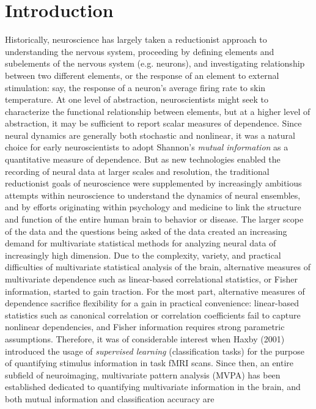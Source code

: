 \documentclass[12pt]{article}
\begin{document}
\section{Introduction}

Historically, neuroscience has largely taken a reductionist approach
to understanding the nervous system, proceeding by defining elements
and subelements of the nervous system (e.g. neurons), and
investigating relationship between two different elements, or the
response of an element to external stimulation: say, the response of a
neuron's average firing rate to skin temperature.  At one level of
abstraction, neuroscientists might seek to characterize the functional
relationship between elements, but at a higher level of abstraction,
it may be sufficient to report scalar measures of dependence.  Since
neural dynamics are generally both stochastic and nonlinear, it was a
natural choice for early neuroscientists to adopt
Shannon's \emph{mutual information} as a quantitative measure of
dependence.  But as new technologies enabled the recording of neural
data at larger scales and resolution, the traditional reductionist
goals of neuroscience were supplemented by increasingly ambitious
attempts within neuroscience to understand the dynamics of neural
ensembles, and by efforts originating within psychology and medicine
to link the structure and function of the entire human brain to
behavior or disease.  The larger scope of the data and the questions
being asked of the data created an increasing demand for multivariate
statistical methods for analyzing neural data of increasingly high
dimension.  Due to the complexity, variety, and practical difficulties
of multivariate statistical analysis of the brain, alternative
measures of multivariate dependence such as linear-based correlational
statistics, or Fisher information, started to gain traction.  For the
most part, alternative measures of dependence sacrifice flexibility
for a gain in practical convenience: linear-based statistics such as
canonical correlation or correlation coefficients fail to capture
nonlinear dependencies, and Fisher information requires strong
parametric assumptions.  Therefore, it was of considerable interest
when Haxby (2001) introduced the usage of \emph{supervised learning}
(classification tasks) for the purpose of quantifying stimulus
information in task fMRI scans.  Since then, an entire subfield of
neuroimaging, multivariate pattern analysis (MVPA) has been
established dedicated to quantifying multivariate information in the
brain, and both mutual information and classification accuracy are
\end{document}
